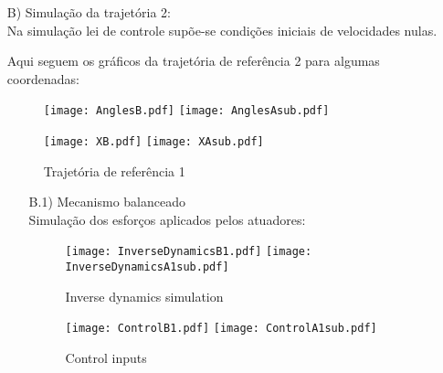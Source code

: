 \begin{itemize}
\begin{itemize}
Din\^amica do erro de controle:

\begin{figure}[H]
\centering
{}
\quad
{}
%
\caption{Error dynamics}
\label{fig:figure}
\end{figure}


\end{itemize}

Pode-se observar que, na maior parte do tempo, os esfor\c{c}os realizados pelos atuadores no caso do mecanismo desbalanceado s\~ao bem maiores do que no caso do mecanismo balanceado. Esse resultado \'e esperado, pois a trajet\'oria de refer\^encia 1 \'e um movimento lento, no qual os efeitos gravitacionais predominam ante os inerciais.


\item[B)] Simula\c{c}\~ao da trajet\'oria 2: \\

Na simula\c{c}\~ao lei de controle sup\~oe-se condi\c{c}\~oes iniciais de velocidades nulas.

Aqui seguem os gr\'aficos da trajet\'oria de refer\^encia 2 para algumas coordenadas:

\begin{figure}[ht]
\centering
\begin{minipage}[b]{0.45\linewidth}
\texttt{[image: AnglesB.pdf]}
\texttt{[image: AnglesAsub.pdf]}
\label{fig:AnglesB}
\end{minipage}
\quad
\begin{minipage}[b]{0.45\linewidth}
\texttt{[image: XB.pdf]}
\texttt{[image: XAsub.pdf]}
\label{fig:XB}
\end{minipage}
\caption{Trajet\'oria de refer\^encia 1}
\end{figure}

\begin{itemize}
\item[B.1)] Mecanismo balanceado \\

Simula\c{c}\~ao dos esfor\c{c}os aplicados pelos atuadores:

\begin{figure}[H]
\centering
\begin{minipage}[b]{0.45\linewidth}
\texttt{[image: InverseDynamicsB1.pdf]}
\texttt{[image: InverseDynamicsA1sub.pdf]}
\label{fig:InverseDynamicsB1}
\caption{Inverse dynamics simulation}
\end{minipage}
\quad
\begin{minipage}[b]{0.45\linewidth}
\texttt{[image: ControlB1.pdf]}
\texttt{[image: ControlA1sub.pdf]}
\label{fig:ControlB1}
\caption{Control inputs}
\end{minipage}
\end{figure}


\end{itemize}
\end{itemize}
